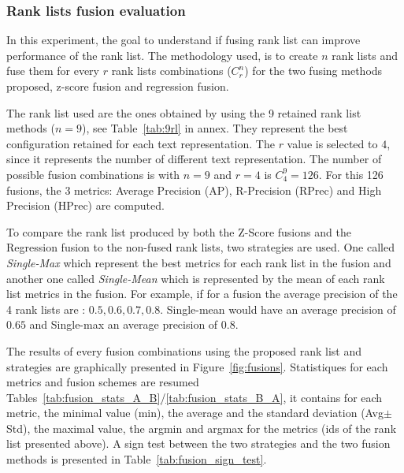 \subsubsection{Rank lists fusion evaluation}

In this experiment, the goal to understand if fusing rank list can improve performance of the rank list.
The methodology used, is to create $n$ rank lists and fuse them for every $r$ rank lists combinations ($C^n_r$) for the two fusing methods proposed, z-score fusion and regression fusion.

The rank list used are the ones obtained by using the 9 retained rank list methods ($n=9$), see Table~\ref{tab:9rl} in annex.
They represent the best configuration retained for each text representation.
The $r$ value is selected to $4$, since it represents the number of different text representation.
The number of possible fusion combinations is with $n=9$ and $r=4$ is $C^{9}_{4} = 126$.
For this 126 fusions, the 3 metrics: Average Precision (AP), R-Precision (RPrec) and High Precision (HPrec) are computed.

To compare the rank list produced by both the Z-Score fusions and the Regression fusion to the non-fused rank lists, two strategies are used.
One called \textit{Single-Max} which represent the best metrics for each rank list in the fusion and another one called \textit{Single-Mean} which is represented by the mean of each rank list metrics in the fusion.
For example, if for a fusion the average precision of the 4 rank lists are : $0.5, 0.6, 0.7, 0.8$. Single-mean would have an average precision of $0.65$ and Single-max an average precision of $0.8$.

The results of every fusion combinations using the proposed rank list and strategies are graphically presented in Figure~\ref{fig:fusions}.
Statistiques for each metrics and fusion schemes are resumed Tables~\ref{tab:fusion_stats_A_B}/\ref{tab:fusion_stats_B_A}, it contains for each metric, the minimal value (min), the average and the standard deviation (Avg$\pm$Std), the maximal value, the argmin and argmax for the metrics (ids of the rank list presented above).
A sign test between the two strategies and the two fusion methods is presented in Table~\ref{tab:fusion_sign_test}.

